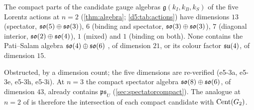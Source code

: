 \begin{proposition}
\label{e5:prop:noPS}
The compact parts of the candidate gauge algebras $\mathfrak g(k_I,k_B,k_S)$ of the five Lorentz actions at $n=2$ (\cref{thm:algebra}; \cref{d5:tab:actions}) have dimensions $13$ (spectator, $\mathfrak{so}(5)\oplus\mathfrak{so}(3)$), $6$ (binding and spectator, $\mathfrak{so}(3)\oplus\mathfrak{so}(3)$), $7$ (diagonal interior,
$\mathfrak{so}(2)\oplus\mathfrak{so}(4)$), $1$ (mixed) and $1$ (binding on both). None contains the Pati--Salam algebra $\mathfrak{so}(4)\oplus\mathfrak{so}(6)$ \cite{PatiSalam}, of dimension $21$,
or its colour factor $\mathfrak{su}(4)$, of dimension $15$.
\end{proposition}

Obstructed, by a dimension count; the five dimensions are re-verified (e5-3a, e5-3e, e5-3h, e5-3i). At $n=3$ the compact spectator algebra
$\mathfrak{so}(8)\oplus\mathfrak{so}(6)$, of dimension $43$, already contains $\mathfrak{ps}_U$ (\cref{sec:spectatorcompact}). The analogue at $n=2$ of  is therefore the intersection of each compact candidate with $\operatorname{Cent}(G_2)$.


